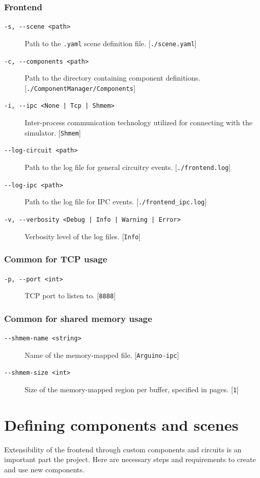 \subsubsection{Frontend}
\begin{description}
    \item[\texttt{-s, -{}-scene <path>}] Path to the \texttt{.yaml} scene definition file. [\texttt{./scene.yaml}]
    \item[\texttt{-c, -{}-components <path>}] Path to the directory containing component definitions. [\texttt{./ComponentManager/Components}]
    \item[\texttt{-i, -{}-ipc <None | Tcp | Shmem>}] Inter-process communication technology utilized for connecting with the simulator. [\texttt{Shmem}]
    \item[\texttt{-{}-log-circuit <path>}] Path to the log file for general circuitry events. [\texttt{./frontend.log}]
    \item[\texttt{-{}-log-ipc <path>}] Path to the log file for IPC events. [\texttt{./frontend\_ipc.log}]
    \item[\texttt{-v, -{}-verbosity <Debug | Info | Warning | Error>}] Verbosity level of the log files. [\texttt{Info}]
\end{description}

\subsubsection{Common for TCP usage}
\begin{description}
    \item[\texttt{-p, -{}-port <int>}] TCP port to listen to. [\texttt{8888}]
\end{description}

\subsubsection{Common for shared memory usage}
\begin{description}
    \item[\texttt{-{}-shmem-name <string>}] Name of the memory-mapped file. [\texttt{Arguino-ipc}]
    \item[\texttt{-{}-shmem-size <int>}] Size of the memory-mapped region per buffer, specified in pages. [\texttt{1}]
\end{description}

\section{Defining components and scenes}
Extensibility of the frontend through custom components and circuits is an important part the project. Here are necessary steps and requirements to create and use new components.

